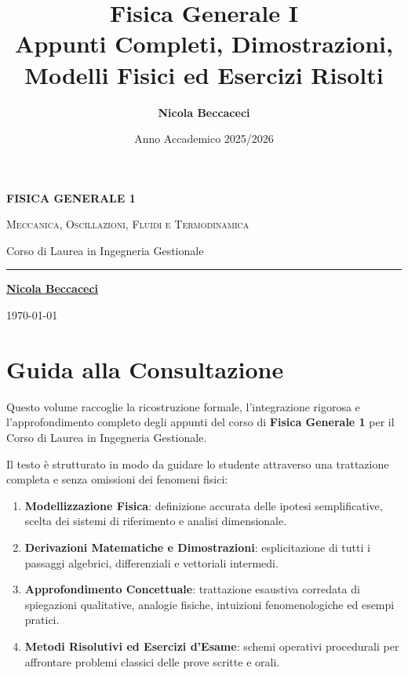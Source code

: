 \documentclass[11pt,a4paper,twoside,openright]{book}
\title{\Huge\textbf{\textsf{Fisica Generale I}}\\[0.5em]
\Large\textsf{Appunti Completi, Dimostrazioni, Modelli Fisici ed Esercizi Risolti}}
\author{\textbf{\textsf{Nicola Beccaceci}}}
\date{\textsf{Anno Accademico 2025/2026}}
\begin{document}
\frontmatter
\begin{titlepage}
    \centering
    \vspace*{2cm}
    {\Huge\bfseries\color{navyblue} FISICA GENERALE 1\par}
    \vspace{0.8cm}
    {\Large\scshape Meccanica, Oscillazioni, Fluidi e Termodinamica\par}
    \vspace{0.5cm}
    {\large\textsf{Corso di Laurea in Ingegneria Gestionale}\par}
    \vfill
    \rule{0.6\textwidth}{1.2pt}\par
    \vspace{1cm}
    {\large\textbf{\underline{Nicola Beccaceci}}\par}
    \vspace{0.5cm}
    {\small \today\par}
    \vspace*{2cm}
\end{titlepage}

\tableofcontents
\cleardoublepage

\chapter*{Guida alla Consultazione}
Questo volume raccoglie la ricostruzione formale, l'integrazione rigorosa e l'approfondimento completo degli appunti del corso di \textbf{Fisica Generale 1} per il Corso di Laurea in Ingegneria Gestionale.

Il testo è strutturato in modo da guidare lo studente attraverso una trattazione completa e senza omissioni dei fenomeni fisici:
\begin{enumerate}
    \item \textbf{Modellizzazione Fisica}: definizione accurata delle ipotesi semplificative, scelta dei sistemi di riferimento e analisi dimensionale.
    \item \textbf{Derivazioni Matematiche e Dimostrazioni}: esplicitazione di tutti i passaggi algebrici, differenziali e vettoriali intermedi.
    \item \textbf{Approfondimento Concettuale}: trattazione esaustiva corredata di spiegazioni qualitative, analogie fisiche, intuizioni fenomenologiche ed esempi pratici.
    \item \textbf{Metodi Risolutivi ed Esercizi d'Esame}: schemi operativi procedurali per affrontare problemi classici delle prove scritte e orali.
\end{enumerate}
\end{document}
